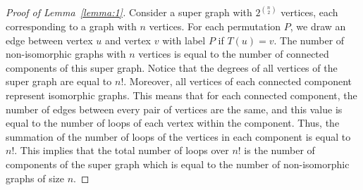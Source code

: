 \begin{solution}
\begin{proof}[Proof of Lemma~\ref{lemma:1}]
	Consider a super graph with $2^{\binom{n}{2}}$ vertices, each corresponding to a graph with $n$ vertices. For each permutation $P$, we draw an edge between vertex $u$ and vertex $v$ with label $P$ if $T(u) = v$. The number of non-isomorphic graphs with $n$ vertices is equal to the number of connected components of this super graph. Notice that the degrees of all vertices of the super graph are equal to $n!$. Moreover, all   vertices of each connected component represent isomorphic graphs. This means that for each connected component, the number of edges between every pair of vertices are the same, and this value is equal to the number of loops of each vertex within the component. Thus, the summation of the number of loops of the vertices in each component is equal to $n!$. This implies that the total number of loops over $n!$ is the number of components of the super graph which is equal to the number of non-isomorphic graphs of size $n$.
\end{proof}
\end{solution}

